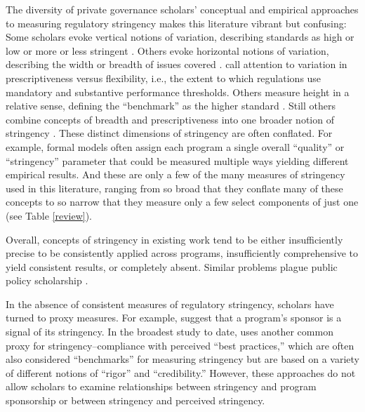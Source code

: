 \documentclass[
      12pt,
            Review ]{article}
\begin{document}
The diversity of private governance scholars' conceptual and empirical
approaches to measuring regulatory stringency makes this literature
vibrant but confusing: Some scholars evoke vertical notions of
variation, describing standards as high or low or more or less stringent
\citep{Fischer2014, Li2015}. Others evoke horizontal notions of
variation, describing the width or breadth of issues covered
\citep{Auld2014, Heyes2017}. \citet{Cashore2007} call attention to
variation in prescriptiveness versus flexibility, i.e., the extent to
which regulations use mandatory and substantive performance thresholds.
Others measure height in a relative sense, defining the ``benchmark'' as
the higher standard \citep{Overdevest2005, Overdevest2010}. Still others
combine concepts of breadth and prescriptiveness into one broader notion
of stringency \citep{Fransen2011}. These distinct dimensions of
stringency are often conflated. For example, formal models often assign
each program a single overall ``quality'' or ``stringency'' parameter
that could be measured multiple ways yielding different empirical
results. And these are only a few of the many measures of stringency
used in this literature, ranging from so broad that they conflate many
of these concepts to so narrow that they measure only a few select
components of just one (see Table \ref{review}).

Overall, concepts of stringency in existing work tend to be either
insufficiently precise to be consistently applied across programs,
insufficiently comprehensive to yield consistent results, or completely
absent. Similar problems plague public policy scholarship
\citep{Brunel2016}.



In the absence of consistent measures of regulatory stringency, scholars
have turned to proxy measures. For example, \citet{Darnall2010} suggest
that a program's sponsor is a signal of its stringency. In the broadest
study to date, \citet{VanderVen2015} uses another common proxy for
stringency--compliance with perceived ``best practices,'' which are
often also considered ``benchmarks'' for measuring stringency but are
based on a variety of different notions of ``rigor'' and
``credibility.'' However, these approaches do not allow scholars to
examine relationships between stringency and program sponsorship or
between stringency and perceived stringency.
\end{document}
